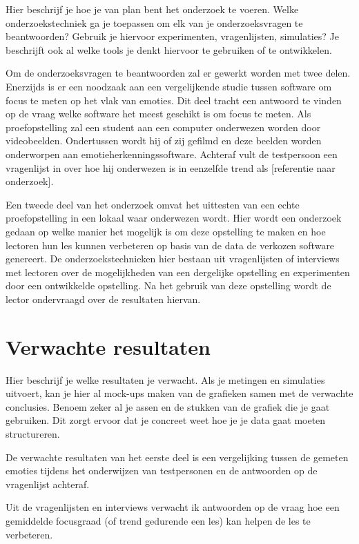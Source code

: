 Hier beschrijf je hoe je van plan bent het onderzoek te voeren. Welke onderzoekstechniek ga je toepassen om elk van je onderzoeksvragen te beantwoorden? Gebruik je hiervoor experimenten, vragenlijsten, simulaties? Je beschrijft ook al welke tools je denkt hiervoor te gebruiken of te ontwikkelen.

Om de onderzoeksvragen te beantwoorden zal er gewerkt worden met twee delen. Enerzijds is er een noodzaak aan een vergelijkende studie tussen software om focus te meten op het vlak van emoties. Dit deel tracht een antwoord te vinden op de vraag welke software het meest geschikt is om focus te meten. Als proefopstelling zal een student aan een computer onderwezen worden door videobeelden. Ondertussen wordt hij of zij gefilmd en deze beelden worden onderworpen aan emotieherkenningssoftware. Achteraf vult de testpersoon een vragenlijst in over hoe hij onderwezen is in eenzelfde trend als [referentie naar onderzoek].

Een tweede deel van het onderzoek omvat het uittesten van een echte proefopstelling in een lokaal waar onderwezen wordt. Hier wordt een onderzoek gedaan op welke manier het mogelijk is om deze opstelling te maken en hoe lectoren hun les kunnen verbeteren op basis van de data de verkozen software genereert. De onderzoekstechnieken hier bestaan uit vragenlijsten of interviews met lectoren over de mogelijkheden van een dergelijke opstelling en experimenten door een ontwikkelde opstelling. Na het gebruik van deze opstelling wordt de lector ondervraagd over de resultaten hiervan.


\section{Verwachte resultaten}
\label{sec:verwachte_resultaten}

Hier beschrijf je welke resultaten je verwacht. Als je metingen en simulaties uitvoert, kan je hier al mock-ups maken van de grafieken samen met de verwachte conclusies. Benoem zeker al je assen en de stukken van de grafiek die je gaat gebruiken. Dit zorgt ervoor dat je concreet weet hoe je je data gaat moeten structureren.


De verwachte resultaten van het eerste deel is een vergelijking tussen de gemeten emoties tijdens het onderwijzen van testpersonen en de antwoorden op de vragenlijst achteraf. 

Uit de vragenlijsten en interviews verwacht ik antwoorden op de vraag hoe een gemiddelde focusgraad (of trend gedurende een les) kan helpen de les te verbeteren.

